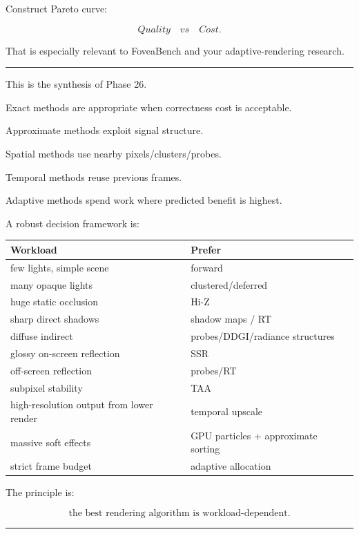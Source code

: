 Construct Pareto curve:

\[
\boxed{
Quality
\quad vs\quad
Cost.
}
\]

That is especially relevant to FoveaBench and your adaptive-rendering research.

\begin{center}\rule{0.5\linewidth}{0.5pt}\end{center}

This is the synthesis of Phase 26.

Exact methods are appropriate when correctness cost is acceptable.

Approximate methods exploit signal structure.

Spatial methods use nearby pixels/clusters/probes.

Temporal methods reuse previous frames.

Adaptive methods spend work where predicted benefit is highest.

A robust decision framework is:

{\def\LTcaptype{none} %
\begin{longtable}[]{@{}ll@{}}
\toprule\noalign{}
Workload & Prefer \\
\midrule\noalign{}
\endhead
\bottomrule\noalign{}
\endlastfoot
few lights, simple scene & forward \\
many opaque lights & clustered/deferred \\
huge static occlusion & Hi-Z \\
sharp direct shadows & shadow maps / RT \\
diffuse indirect & probes/DDGI/radiance structures \\
glossy on-screen reflection & SSR \\
off-screen reflection & probes/RT \\
subpixel stability & TAA \\
high-resolution output from lower render & temporal upscale \\
massive soft effects & GPU particles + approximate sorting \\
strict frame budget & adaptive allocation \\
\end{longtable}
}

The principle is:

\[
\boxed{
\text{the best rendering algorithm is workload-dependent}.
}
\]

\begin{center}\rule{0.5\linewidth}{0.5pt}\end{center}

